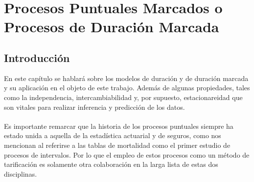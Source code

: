 \chapter{Procesos Puntuales Marcados o Procesos de Duraci\'on Marcada}
\section{Introducci\'on}
En este cap\'itulo se hablar\'a sobre los modelos de duraci\'on y de duraci\'on marcada y su aplicaci\'on en el objeto de este trabajo. Adem\'as de algunas propiedades, tales como la independencia, intercambiabilidad y, por supuesto, estacionareidad que son vitales para realizar inferencia y predicci\'on de los datos.\\
\\
Es importante remarcar que la historia de los procesos puntuales siempre ha estado unida a aquella de la estad\'istica actuarial y de seguros, como nos mencionan \cite{daley2003} al referirse a las tablas de mortalidad como el primer estudio de procesos de intervalos. Por lo que el empleo de estos procesos como un m\'etodo de tarificaci\'on es solamente otra colaboraci\'on en la larga lista de estas dos disciplinas.\\
